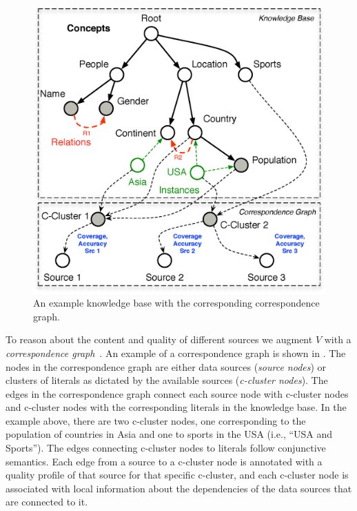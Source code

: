 \documentclass{sig-alternate-05-2015}
\begin{document}
\begin{figure}[h]
	\begin{center}
	\includegraphics[clip,scale=0.25]{fig/kgcg}
	\vspace{-10pt}
	\caption{An example knowledge base with the corresponding correspondence graph.}
	\label{fig:kgcg}
	\vspace{-15pt}
	\end{center}
\end{figure}

To reason about the content and quality of different sources we augment $V$ with a {\em correspondence graph}~\cite{rekatsinas:2015}. An example of a correspondence graph is shown in . The nodes in the correspondence graph are either data sources ({\em source nodes}) or clusters of literals as dictated by the available sources ({\em c-cluster nodes}). The edges in the correspondence graph connect each source node with c-cluster nodes and c-cluster nodes with the corresponding literals in the knowledge base.  In the example above, there are two c-cluster nodes, one corresponding to the population of countries in Asia and one to sports in the USA (i.e., ``USA and Sports''). The edges connecting c-cluster nodes to literals follow conjunctive semantics. Each edge from a source to a c-cluster node is annotated with a quality profile of that source for that specific c-cluster, and each c-cluster node is associated with local information about the dependencies of the data sources that are connected to it. 
\end{document}
